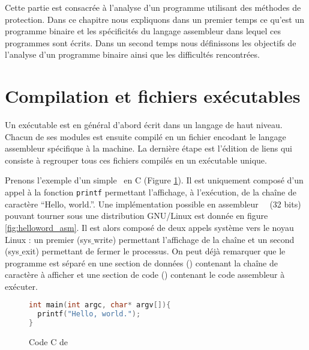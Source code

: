 Cette partie est consacrée à l'analyse d'un programme utilisant des méthodes de protection.
Dans ce chapitre nous expliquons dans un premier temps ce qu'est un programme binaire et les spécificités du langage assembleur dans lequel ces programmes sont écrits.
Dans un second temps nous définissons les objectifs de l'analyse d'un programme binaire ainsi que les difficultés rencontrées.


\section{Compilation et fichiers exécutables}

Un exécutable est en général d'abord écrit dans un langage de haut niveau. Chacun de ses modules est ensuite compilé en un fichier  encodant le langage assembleur spécifique à la machine. La dernière étape est l'édition de liens qui consiste à regrouper tous ces fichiers compilés en un exécutable unique.

Prenons l'exemple d'un simple \helloworld\ en C (Figure \ref{fig:helloword_c}). Il est uniquement composé d'un appel à la fonction \texttt{printf} permettant l'affichage, à l'exécution, de la chaîne de caractère ``Hello, world.''.
Une implémentation possible en assembleur \nasm\ \xq\ (32 bits) pouvant tourner sous une distribution GNU/Linux est donnée en figure \ref{fig:helloword_asm}. Il est alors composé de deux appels système vers le noyau Linux : un premier (sys$\_$write) permettant l'affichage de la chaîne et un second (sys$\_$exit) permettant de fermer le processus.
On peut déjà remarquer que le programme est séparé en une section de données (\pdata) contenant la chaîne de caractère à afficher et une section de code (\ptext) contenant le code assembleur à exécuter.
\begin{figure}
\begin{lstlisting}[language={C}]
int main(int argc, char* argv[]){
  printf("Hello, world.");
}
\end{lstlisting}
\caption{Code C de \helloworld}
\label{fig:helloword_c}
\end{figure}


